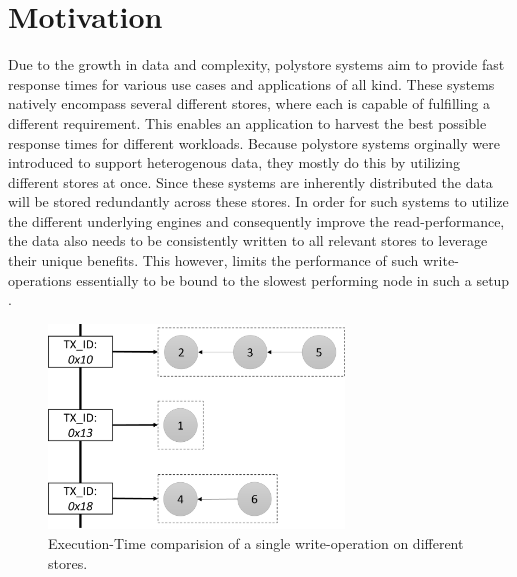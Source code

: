 
\section{Motivation}

Due to the growth in data and complexity, polystore systems aim to provide fast response times for various use cases and applications of all kind.
These systems natively encompass several different stores, where each is capable of fulfilling a different requirement. 
This enables an application to harvest the best possible response times for different workloads.
Because polystore systems orginally were introduced to support heterogenous data, they mostly do this by utilizing different stores at once.
Since these systems are inherently distributed the data will be stored redundantly across these stores. 
In order for such systems to utilize the different underlying engines and consequently improve the read-performance, 
the data also needs to be consistently written to all relevant stores to leverage their unique benefits.
This however, limits the performance of such write-operations essentially to be bound to the slowest performing node in such a setup .

\begin{figure}[t] 
    \centering 
    \includegraphics[width=0.7\textwidth]{Figures/store_comparision.png}
    \caption{Execution-Time comparision of a single write-operation on different stores.}
    \label{fig:store_comparision}
\end{figure}
 
